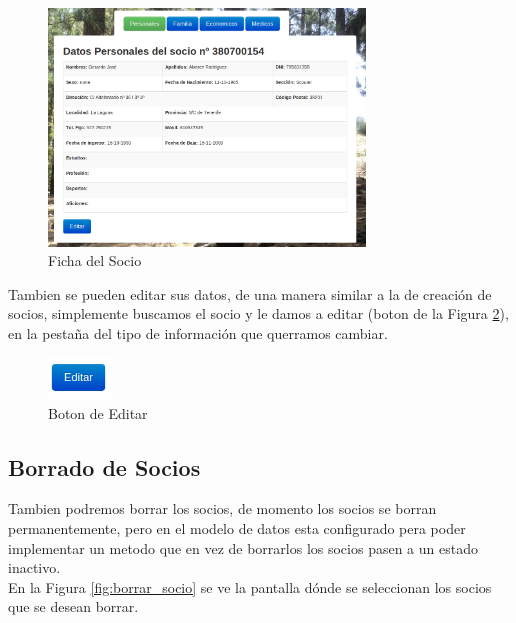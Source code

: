\begin{figure}[H]
\begin{center}
\includegraphics[width=0.75\textwidth]{images/datos_personales.jpg}
\caption{Ficha del Socio}
\label{fig:ficha_socio}
\end{center}
\end{figure}

Tambien se pueden editar sus datos, de una manera similar a la de creación de socios, simplemente buscamos el socio y le damos a editar (boton de la Figura \ref{fig:edit}), en la pestaña del tipo de información
que querramos cambiar.\\

\begin{figure}[H]
\begin{center}
\includegraphics[width=0.15\textwidth]{images/boton_editar.jpg}
\caption{Boton de Editar}
\label{fig:edit}
\end{center}
\end{figure}

\subsection{Borrado de Socios}
Tambien podremos borrar los socios, de momento los socios se borran permanentemente, pero en el modelo de datos esta configurado pera poder implementar un metodo que en vez de borrarlos los socios pasen
a un estado inactivo.\\

En la Figura \ref{fig:borrar_socio} se ve la pantalla dónde se seleccionan los socios que se desean borrar.\\

